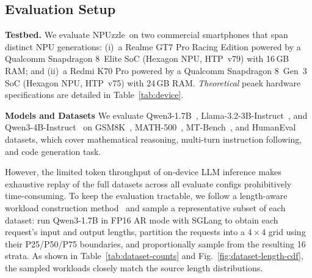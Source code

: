 \documentclass[sigconf,nonacm,10pt]{acmart}
\newcommand{\name}{NPUzzle\xspace}
\begin{document}
{{\subsection{Evaluation Setup}
\noindent\textbf{Testbed.}
We evaluate \name\ on two commercial smartphones that span distinct NPU generations: (i)~a Realme GT7 Pro Racing Edition powered by a Qualcomm Snapdragon 8~Elite SoC (Hexagon NPU, HTP~v79) with 16\,GB RAM; and (ii)~a Redmi K70 Pro powered by a Qualcomm Snapdragon 8~Gen~3 SoC (Hexagon NPU, HTP~v75) with 24\,GB RAM. \emph{Theoretical} peaek hardware specifications are detailed in Table~\ref{tab:device}.
\begin{table}[t]
  \centering
  \caption{Testbed specifications.}
  \label{tab:device}
  \vspace{-10pt}
\end{table}


\noindent\textbf{Models and Datasets}
We evaluate Qwen3-1.7B~\cite{yang2025qwen3}, Llama-3.2-3B-Instruct~\cite{grattafiori2024llama3}, and Qwen3-4B-Instruct~\cite{yang2025qwen3} on GSM8K~\cite{Karl2021GSM8K}, MATH-500~\cite{Dan2021MATH-500}, MT-Bench~\cite{Dan2021MATH-500}, and HumanEval~\cite{Chen2021HumanEval} datasets, which cover mathematical reasoning, multi-turn instruction following, and code generation task. 

However, the limited token throughput of on-device LLM inference makes exhaustive replay of the full datasets across all evaluate configs prohibitively time-consuming. To keep the evaluation tractable, we follow a length-aware workload construction method~\cite{DistServe2024Zhong} and sample a representative subset of each dataset: run Qwen3-1.7B in FP16 AR mode with SGLang to obtain each request's input and output lengths, partition the requests into a $4\times4$ grid using their P25/P50/P75 boundaries, and proportionally sample from the resulting 16 strata. As shown in Table~\ref{tab:dataset-counts} and Fig.~\ref{fig:dataset-length-cdf}, the sampled workloads closely match the source length distributions.



}}
\end{document}
